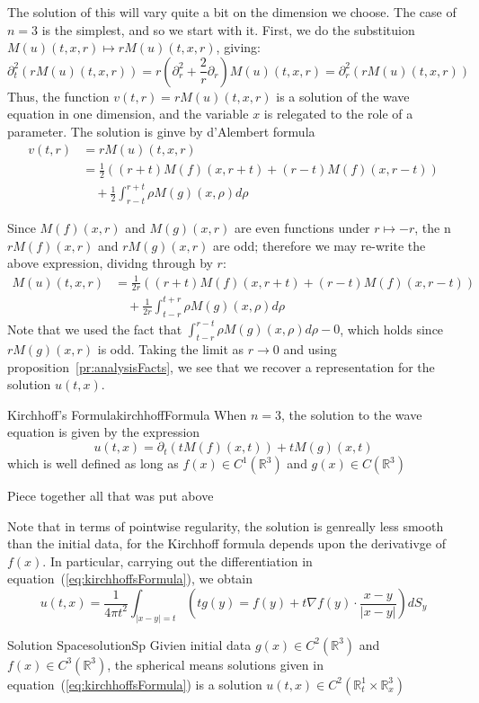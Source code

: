 \documentclass{book}
\newenvironment{Proof}[1][]
  {\begin{ProofTcb}[#1]}
  {\end{ProofTcb}}
\newcommand{\R}{{\mathbb{R}}}
\newcommand{\rw}{\rightarrow}
\begin{document}
The solution of this will vary quite a bit on the dimension we choose. The case of $n =3$ is the simplest, and so we
start with it. First, we do the substituion $M(u)(t,x,r) \mapsto rM(u)(t,x,r)$, giving:
\[
	 \partial_t^2 \left(rM(u)(t,x,r)\right) = r\left(  \partial_r^2 + \frac{2}{r}  \partial_r \right) M(u)(t,x,r)
	 =   \partial_r^2 \left( rM(u)(t,x,r)\right)
\]
Thus, the function $v(t,r) = rM(u)(t,x,r)$ is a solution of the wave equation in one dimension, and the variable $x$ is
relegated to the role of a parameter. The solution is ginve by d'Alembert formula
\begin{align*}
	v(t,r) &= rM(u)(t,x,r)\\
	&= \frac{1}{2} \left( (r+t)M(f)(x, r+t) + (r-t)M(f)(x, r-t)\right)\\
	&\quad + \frac{1}{2} \int_{r-t}^{r+t} \rho M(g)(x,\rho) d\rho
\end{align*}

Since $M(f)(x,r)$ and $M(g)(x,r)$ are even functions under $r \mapsto -r$, the n$rM(f)(x,r)$ and $rM(g)(x,r)$ are odd;
therefore we may re-write the above expression, dividng through by $r$:
\begin{align*}
	M(u)(t,x,r) &= \frac{1}{2r} \left( (r+t)M(f)(x, r+t) + (r-t)M(f)(x, r-t)\right)\\
	&\quad + \frac{1}{2r} \int_{t-r}^{t+r} \rho M(g)(x,\rho) d\rho
\end{align*}
Note that we used the fact that $\int_{t-r}^{r-t} \rho M(g)(x,\rho)d\rho - 0$,  which holds since $rM(g)(x,r)$ is odd.
Taking the limit as $r \rw 0$ and using proposition~\ref{pr:analysisFacts}, we see that we recover
a representation
for the solution $u(t,x)$.


\begin{thm}{Kirchhoff's Formula}{kirchhoffFormula}
	When $n = 3$, the solution to the wave equation is given by the expression
	\begin{equation}\label{eq:kirchhoffsFormula}
	  u(t,x) =  \partial_t \left(tM(f)(x,t)\right) + tM(g)(x,t)
	\end{equation}
	which is well defined as long as $f(x) \in C^1(\R^3)$ and $g(x) \in C(\R^3)$
\end{thm}

\begin{Proof}
	Piece together all that was put above
\end{Proof}

Note that in terms of pointwise regularity, the solution is genreally less smooth than the initial data, for the
Kirchhoff formula depends upon the derivativge of $f(x)$. In particular, carrying out the differentiation in
equation~(\ref{eq:kirchhoffsFormula}), we obtain
\[
	u(t,x) = \frac{1}{4\pi t^2}\int_{|x-y| = t} \left(tg(y) = f(y) + t\nabla f(y)\cdot \frac{x-y}{|x-y|}\right) dS_y
\]
\begin{cor}{Solution Space}{solutionSp}
	Givien initial data $g(x) \in C^2(\R^3)$ and $f(x) \in C^3(\R^3)$, the spherical means solutions given in
	equation~(\ref{eq:kirchhoffsFormula}) is a solution $u(t,x) \in C^2(\R_t^1 \times \R_x^3)$
\end{cor}
\end{document}
